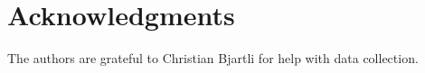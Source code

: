 \documentclass[sigconf]{acmart} %
\begin{document}
\maketitle

% 




\section*{Acknowledgments}
The authors are grateful to Christian Bjartli for help with data collection.


\end{document}
